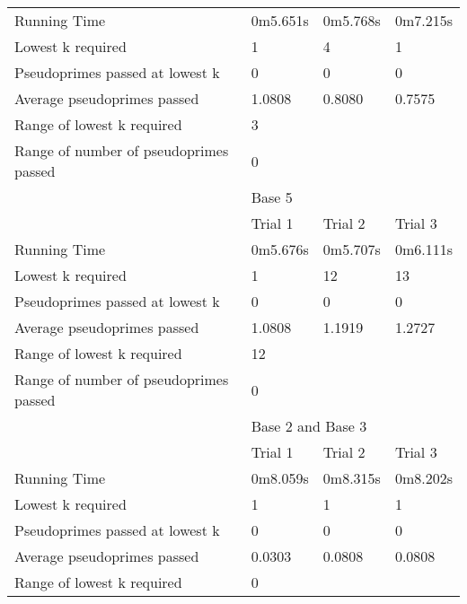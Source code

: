 \documentclass{article}
\begin{document}
\begin{appendices}
\begin{longtable}{llll}
Running Time                           & 0m5.651s & 0m5.768s & 0m7.215s         \\
Lowest k required                      & 1        & 4        & 1                \\
Pseudoprimes passed at lowest k        & 0        & 0        & 0                \\
Average pseudoprimes passed            & 1.0808   & 0.8080   & 0.7575           \\
\cmidrule(lr){2-4}
Range of lowest k required             & \multicolumn{3}{l}{3}                  \\
Range of number of pseudoprimes passed & \multicolumn{3}{l}{0}                  \\
\midrule
                                       & \multicolumn{3}{l}{Base 5}             \\
\midrule
                                       & Trial 1  & Trial 2  & Trial 3          \\
Running Time                           & 0m5.676s & 0m5.707s & 0m6.111s         \\
Lowest k required                      & 1        & 12       & 13               \\
Pseudoprimes passed at lowest k        & 0        & 0        & 0                \\
Average pseudoprimes passed            & 1.0808   & 1.1919   & 1.2727           \\
\cmidrule(lr){2-4}
Range of lowest k required             & \multicolumn{3}{l}{12}                 \\
Range of number of pseudoprimes passed & \multicolumn{3}{l}{0}                  \\
\midrule
                                       & \multicolumn{3}{l}{Base 2 and Base 3}  \\
\midrule
                                       & Trial 1  & Trial 2  & Trial 3          \\
Running Time                           & 0m8.059s & 0m8.315s & 0m8.202s         \\
Lowest k required                      & 1        & 1        & 1                \\
Pseudoprimes passed at lowest k        & 0        & 0        & 0                \\
Average pseudoprimes passed            & 0.0303   & 0.0808   & 0.0808           \\
\cmidrule(lr){2-4}
Range of lowest k required             & \multicolumn{3}{l}{0}                  \\

\end{longtable}
\end{appendices}
\end{document}
